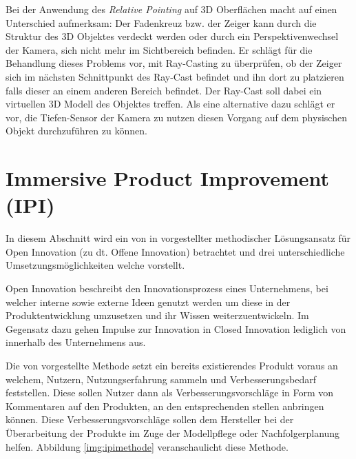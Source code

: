 Bei der Anwendung des \textit{Relative Pointing} auf 3D Oberflächen macht \citeauthor{Vincent2014} auf einen Unterschied aufmerksam: Der Fadenkreuz bzw. der Zeiger kann durch die Struktur des
3D Objektes verdeckt werden oder durch ein Perspektivenwechsel der Kamera, sich nicht mehr im Sichtbereich befinden. Er schlägt für die Behandlung dieses Problems vor, mit Ray-Casting zu überprüfen, 
ob der Zeiger sich im nächsten Schnittpunkt des Ray-Cast befindet und ihn dort zu platzieren falls dieser an einem anderen Bereich befindet. Der Ray-Cast soll dabei ein virtuellen 3D Modell des Objektes treffen.
Als eine alternative dazu schlägt er vor, die Tiefen-Sensor der Kamera zu nutzen diesen Vorgang auf dem physischen Objekt durchzuführen zu können. \cite[S.~83]{Vincent2014}

\section{Immersive Product Improvement (IPI)} \label{ipi_section}

In diesem Abschnitt wird ein von \citeauthor{Kirschner2012} in \cite{Kirschner2012} vorgestellter methodischer Lösungsansatz für Open Innovation (zu dt. Offene Innovation) betrachtet und 
drei unterschiedliche Umsetzungsmöglichkeiten welche \citeauthor{Kirschner2012} vorstellt. 

Open Innovation beschreibt den Innovationsprozess eines Unternehmens, bei welcher interne sowie externe Ideen genutzt werden um diese in der Produktentwicklung umzusetzen und ihr Wissen weiterzuentwickeln. 
Im Gegensatz dazu gehen Impulse zur Innovation in Closed Innovation  lediglich von innerhalb des Unternehmens aus.\cite[S.~32]{Kirschner2012}

Die von \citeauthor{Kirschner2012} vorgestellte Methode setzt ein bereits existierendes Produkt voraus an welchem,  Nutzern,  Nutzungserfahrung sammeln und Verbesserungsbedarf feststellen. 
Diese sollen Nutzer dann als Verbesserungsvorschläge in Form von Kommentaren auf den Produkten, an den entsprechenden stellen anbringen können. Diese Verbesserungsvorschläge sollen dem Hersteller
bei der Überarbeitung der Produkte im Zuge der Modellpflege oder Nachfolgerplanung helfen. Abbildung \ref{img:ipimethode} veranschaulicht diese Methode. \cite[S.~122]{Kirschner2012}


